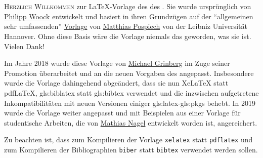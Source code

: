 \chapter*{\TransAcknowledgements}
%
%
%
\markboth{\TransAcknowledgements}{\TransAcknowledgements}
%
%
\lettrine[nindent=0.2em]{H}{erzlich Willkommen} zur \LaTeX-Vorlage
des  %
des . %
Sie wurde ursprünglich von
\href{http://ies.anthropomatik.kit.edu/mitarbeiter.php?person=woock}{Philipp Woock}
entwickelt und basiert in ihren Grundzügen auf der \enquote{allgemeinen sehr umfassenden}
\href{http://www.matthiaspospiech.de/latex/templates/thesis/}{Vorlage} von 
\href{http://www.matthiaspospiech.de}{Matthias Pospiech} von der Leibniz Universität Hannover.
Ohne diese Basis wäre die Vorlage niemals das geworden, was sie ist. Vielen Dank!

Im Jahre 2018 wurde diese Vorlage von
\href{http://ies.anthropomatik.kit.edu/mitarbeiter.php?person=grinberg}{Michael Grinberg}
im Zuge seiner Promotion überarbeitet und an die neuen Vorgaben des  angepasst.
Insbesondere wurde die Vorlage dahingehend abgeändert, dass sie nun XeLaTeX statt pdfLaTeX, 
\gls{gls:biblatex} statt \gls{gls:bibtex} verwendet und die inzwischen aufgetretene
Inkompatibilitäten mit neuen Versionen einiger \gls{gls:latex}-\glspl{gls:pkg} behebt.
In 2019 wurde die Vorlage weiter angepasst und mit Beispielen aus einer Vorlage
für studentische Arbeiten, die von
\href{https://crypto.iti.kit.edu/index.php?id=nagel}{Mathias Nagel}
entwickelt worden ist, angereichert.

Zu beachten ist, dass zum Kompilieren der Vorlage \texttt{xelatex} statt \texttt{pdflatex}
und zum Kompilieren der Bibliographien \texttt{biber} statt \texttt{bibtex} verwendet werden sollen.